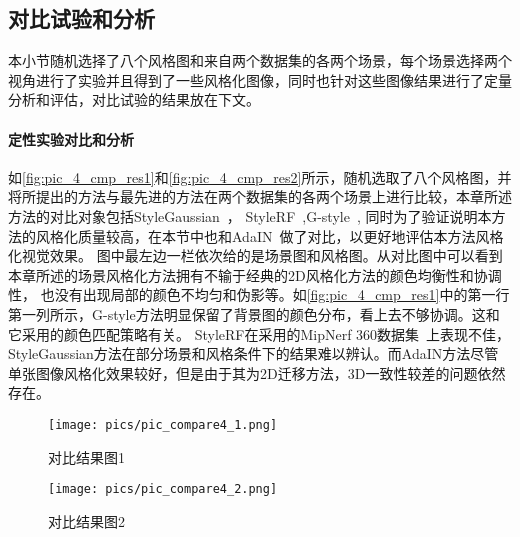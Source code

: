 \subsection{对比试验和分析}
本小节随机选择了八个风格图和来自两个数据集的各两个场景，每个场景选择两个视角进行了实验并且得到了一些风格化图像，同时也针对这些图像结果进行了定量分析和评估，对比试验的结果放在下文。
\paragraph{定性实验对比和分析}
如\autoref{fig:pic_4_cmp_res1}和\autoref{fig:pic_4_cmp_res2}所示，随机选取了八个风格图，并将所提出的方法与最先进的方法在两个数据集的各两个场景上进行比较，本章所述方法的对比对象包括StyleGaussian~\cite{liu2024stylegaussian}，
StyleRF~\cite{liu2023stylerf},G-style~\cite{kovacs2024g}, 同时为了验证说明本方法的风格化质量较高，在本节中也和AdaIN~\cite{huang2017arbitrary}做了对比，以更好地评估本方法风格化视觉效果。
图中最左边一栏依次给的是场景图和风格图。从对比图中可以看到本章所述的场景风格化方法拥有不输于经典的2D风格化方法的颜色均衡性和协调性，
也没有出现局部的颜色不均匀和伪影等。如\autoref{fig:pic_4_cmp_res1}中的第一行第一列所示，G-style方法明显保留了背景图的颜色分布，看上去不够协调。这和它采用的颜色匹配策略有关。
StyleRF在采用的MipNerf 360数据集~\cite{barron2022mip}上表现不佳，StyleGaussian方法在部分场景和风格条件下的结果难以辨认。而AdaIN方法尽管单张图像风格化效果较好，但是由于其为2D迁移方法，3D一致性较差的问题依然存在。
\begin{figure}[htb]
    \centering
    \texttt{[image: pics/pic\_compare4\_1.png]}
    \caption{\label{fig:pic_4_cmp_res1}对比结果图1}
\end{figure}
\begin{figure}[htb]
    \centering
    \texttt{[image: pics/pic\_compare4\_2.png]}
    \caption{\label{fig:pic_4_cmp_res2}对比结果图2}
\end{figure}
